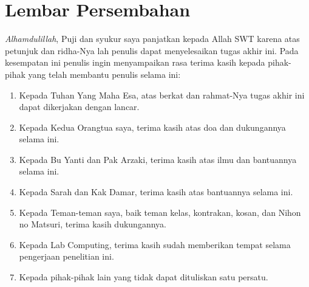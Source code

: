 \chapter*{Lembar Persembahan}

  \textit{Alhamdulillah}, Puji dan syukur saya panjatkan kepada Allah SWT karena atas petunjuk dan ridha-Nya lah penulis dapat menyelesaikan tugas akhir ini. Pada kesempatan ini penulis ingin menyampaikan rasa terima kasih kepada pihak-pihak yang telah membantu penulis selama ini:
  \begin{enumerate}
      \item Kepada Tuhan Yang Maha Esa, atas berkat dan rahmat-Nya tugas akhir ini dapat dikerjakan dengan lancar.
      
      \item Kepada Kedua Orangtua saya, terima kasih atas doa dan dukungannya selama ini.
      
      \item Kepada Bu Yanti dan Pak Arzaki, terima kasih atas ilmu dan bantuannya selama ini.
      
      \item Kepada Sarah dan Kak Damar, terima kasih atas bantuannya selama ini.
      
      \item Kepada Teman-teman saya, baik teman kelas, kontrakan, kosan, dan Nihon no Matsuri, terima kasih dukungannya.
      
      \item Kepada Lab Computing, terima kasih sudah memberikan tempat selama pengerjaan penelitian ini.
      
      \item Kepada pihak-pihak lain yang tidak dapat dituliskan satu persatu.
  \end{enumerate}